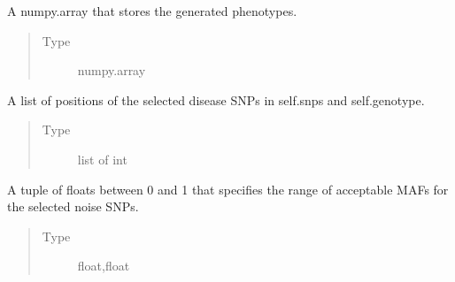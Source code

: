 \documentclass[a4paper,10pt,english]{sphinxhowto}
\begin{document}
\begin{fulllineitems}
\begin{fulllineitems}
\begin{quote}
\begin{description}
\end{description}\end{quote}

\end{fulllineitems}


\begin{fulllineitems}
\label{\detokenize{utils:utils.data_simulator.DataSimulator.phenotype}}
A numpy.array that stores the generated phenotypes.
\begin{quote}\begin{description}
\item[{Type}] \leavevmode
numpy.array

\end{description}\end{quote}

\end{fulllineitems}


\begin{fulllineitems}
\label{\detokenize{utils:utils.data_simulator.DataSimulator.disease_snps}}
A list of positions of the selected disease SNPs in self.snps and self.genotype.
\begin{quote}\begin{description}
\item[{Type}] \leavevmode
list of int

\end{description}\end{quote}

\end{fulllineitems}


\begin{fulllineitems}
\label{\detokenize{utils:utils.data_simulator.DataSimulator.noise_maf_range}}
A tuple of floats between 0 and 1 that specifies the range of acceptable MAFs for the selected noise SNPs.
\begin{quote}\begin{description}
\item[{Type}] \leavevmode
float,float


\end{description}
\end{quote}
\end{fulllineitems}
\end{fulllineitems}
\end{document}
